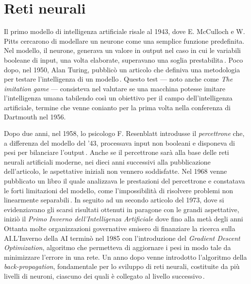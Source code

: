 
\chapter{Reti neurali}\label{chp:neural-networks}
% 
Il primo modello di intelligenza artificiale risale al 1943, dove E. McCulloch e W. Pitts cercarono di modellare un neurone come una semplice funzione predefinita. Nel modello, il neurone, generava un valore in output nel caso in cui le variabili booleane di input, una volta elaborate, superavano una soglia prestabilita\,\cite[A logical calculus of the ideas immanent in nervous activity]{mcculloch1943logical}. Poco dopo, nel 1950, Alan Turing, pubblicò un articolo che definiva una metodologia per testare l'intelligenza di un modello\,\cite[Computing machinery and intelligence]{turing2009computing}. Questo test — noto anche come \textsl{The imitation game} — consisteva nel valutare se una macchina potesse imitare l'intelligenza umana tabilendo così un obiettivo per il campo dell'intelligenza artificiale, termine che venne conianto per la prima volta nella conferenza di Dartmouth nel 1956.

Dopo due anni, nel 1958, lo psicologo F. Resenblatt introdusse il \textsl{percettrone} che, a differenza del modello del '43, processava input non booleani e disponeva di pesi per bilanciare l'output\,\cite[The perceptron: a probabilistic model for information storage and organization in the brain.]{rosenblatt1958perceptron}. Anche se il percettrone sarà alla base delle reti neurali artificiali moderne, nei dieci anni successivi alla pubblicazione dell'articolo, le aspettative iniziali non vennero soddisfatte. Nel 1968 venne pubblicato un libro il quale analizzava le prestazioni del percettrone e constatava le forti limitazioni del modello, come l'impossibilità di risolvere problemi non linearmente separabili\,\cite[Perceptrons]{minsky2017perceptrons}. In seguito ad un secondo articolo del 1973, dove si evidenziavano gli scarsi risultati ottenuti in paragone con le grandi aspettative, iniziò il \textsl{Primo Inverno dell'Intelligenza Artificiale} dove fino alla metà degli anni Ottanta molte organizzazioni governative smisero di finanziare la ricerca sulla AI.\@ L'Inverno della AI terminò nel 1985 con l'introduzione del \textit{Gradient Descent Optimization}, algoritmo che permetteva di aggiornare i pesi in modo tale da minimizzare l'errore in una rete. Un anno dopo venne introdotto l'algoritmo della \textit{back-propagation}, fondamentale per lo sviluppo di reti neurali, costituite da più livelli di neuroni, ciascuno dei quali è collegato al livello successivo\,\cite[Learning representations by back-propagating errors]{rumelhart1986learning}.

